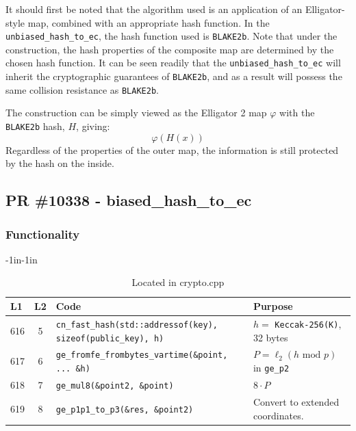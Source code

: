 \documentclass[12pt,titlepage,table]{article}
\begin{document}
It should first be noted that the algorithm used is an application of an Elligator-style map, combined with an appropriate hash function. In the \verb+unbiased_hash_to_ec+, the hash function used is \verb+BLAKE2b+. Note that under the construction, the hash properties of the composite map are determined by the chosen hash function. It can be seen readily that the \verb+unbiased_hash_to_ec+ will inherit the cryptographic guarantees of \verb+BLAKE2b+, and as a result will possess the same collision resistance as \verb+BLAKE2b+.

The construction can be simply viewed as the Elligator 2 map $\varphi$ with the \verb+BLAKE2b+ hash, $H$, giving:
$$\varphi(H(x))$$
Regardless of the properties of the outer map, the information is still protected by the hash on the inside.

\medskip


\newpage
\subsection{PR \#10338 - biased\_hash\_to\_ec}
\subsubsection{Functionality}


\begin{table}[htbp]
\caption{biased\_hash\_to\_ec Source To Spec Map}
\begin{adjustwidth}{-1in}{-1in}
\centering
{
\begin{tabular}{| l | c | l | l |}
\hline
\textbf{L1} & \textbf{L2} & \textbf{Code} & \textbf{Purpose} \\
\hline
\hline
616 & 5 & \verb+cn_fast_hash(std::addressof(key), sizeof(public_key), h)+ & $h =$ \verb+Keccak-256(K)+, 32 bytes \\
617 & 6 & \verb+ge_fromfe_frombytes_vartime(&point, ... &h)+ & $P = \ell_2(h \text{ mod } p)$ in \verb+ge_p2+ \\
618 & 7 & \verb+ge_mul8(&point2, &point)+ & $8 \cdot P$ \\
619 & 8 & \verb+ge_p1p1_to_p3(&res, &point2)+ & Convert to extended coordinates. \\
\hline
\end{tabular}}
\end{adjustwidth}
\caption*{Located in crypto.cpp}
\end{table}
\end{document}
